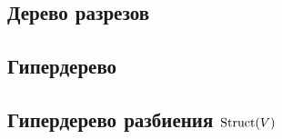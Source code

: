 \documentclass[../main.tex]{subfiles}
\begin{document}
\subsection{Дерево разрезов}

\subsection{Гипердерево}

\subsection{Гипердерево разбиения $\operatorname{Struct}(V)$}

\end{document}
